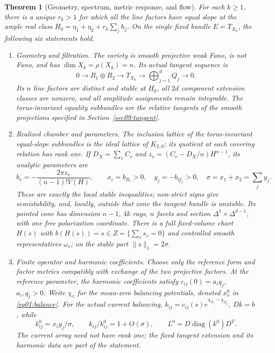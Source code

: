 \documentclass[11pt]{amsart}
\newtheorem{theorem}{Theorem}[section]
\theoremstyle{definition}
\theoremstyle{remark}
\newcommand{\diag}{\operatorname{diag}}
\begin{document}
\begin{theorem}[Geometry, spectrum, metric response, and flow]
\label{thm01:synthesis}
For each \(k\ge1\), there is a unique \(r_k>1\) for which all
the line factors have equal slope at the ample real class
\(H_0=\eta_1+\eta_2+r_k\sum_jh_j\). On the single fixed bundle
\(E=T_{X_k}\), the following six statements hold.
\begin{enumerate}
\item \emph{Geometry and filtration.}
The variety is smooth projective weak Fano, is not Fano, and has
\(\dim X_k=\rho(X_k)=n\). Its actual tangent sequence is
\begin{equation}\label{eq01:tangent}
 0\longrightarrow R_1\oplus R_2\longrightarrow T_{X_k}
          \longrightarrow\bigoplus_{j=1}^dQ_j\longrightarrow0.
\end{equation}
Its \(n\) line factors are distinct and stable at \(H_0\), all
\(2d\) component extension classes are nonzero, and all amplitude
assignments remain integrable. The torus-invariant equality subbundles are the
relative tangents of the smooth projections specified in
Section~\ref{sec09:tangent}.

\item \emph{Realized chamber and parameters.}
The inclusion lattice of the torus-invariant equal-slope subbundles is the ideal
lattice of \(K_{2,d}\); its quotient at each covering relation
has rank one. If \(D_X=\sum_vC_v\) and
\(z_v=(C_v-D_X/n)H^{n-1}\), its analytic parameters are
\begin{equation}\label{eq01:sign}
 b_v=-\frac{2\pi z_v}{(n-1)!V(H)},\qquad
 x_i=b_{R_i}>0,\quad y_j=-b_{Q_j}>0,\quad
 \sigma=x_1+x_2=\sum_jy_j.
\end{equation}
These are exactly the local stable inequalities; non-strict signs
give semistability, and, locally, outside that cone the tangent bundle is
unstable. Its pointed cone has dimension \(n-1\), \(4k\) rays,
\(n\) facets and section \(\Delta^1\times\Delta^{d-1}\), with
one free polarization coordinate. There is a full fixed-volume
chart \(H(s)\) with \(b(H(s))=s\in Z=\{\sum_vs_v=0\}\) and
controlled smooth representatives \(\omega_s\); on the stable
part \(\|s\|_1=2\sigma\).

\item \emph{Finite operator and harmonic coefficients.}
Choose only the reference form and factor metrics compatibly with
exchange of the two projective factors. At the reference parameter,
the harmonic coefficients satisfy
\(c_{ij}(0)=a_iq_j\), \(a_i,q_j>0\).
Write \(\chi_v\) for the mean-zero balancing potentials, denoted
\(x_v^0\) in \eqref{eq01:balance}. For the actual current balancing,
\(k_{ij}=c_{ij}(s)
e^{\chi_{R_i}-\chi_{Q_j}}\), \(Dk=b\), while
\begin{equation}\label{eq01:leading}
 k^0_{ij}=x_i y_j/\sigma,\qquad k_{ij}/k^0_{ij}=1+O(\sigma),
 \qquad L^0=D\diag(k^0)D^T.
\end{equation}
The current array need not have rank one; the fixed tangent
extension and its harmonic data are part of the statement.


\end{enumerate}
\end{theorem}
\end{document}
